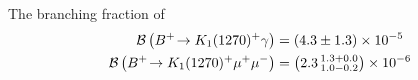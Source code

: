 The branching fraction of 
\begin{align}
  {\ensuremath{\cal B}}\left(B^+\!\rightarrow K_1(1270)^+\gamma\right) &= \left(4.3\pm1.3\right)\times 10^{-5} \\
  {\cal B}\left(B^+\!\rightarrow K_1(1270)^+\mu^+\mu^-\right) &= \left(2.3\,^{1.3+0.0}_{1.0-0.2}\right)\times 10^{-6}
\end{align}








%
%
%
